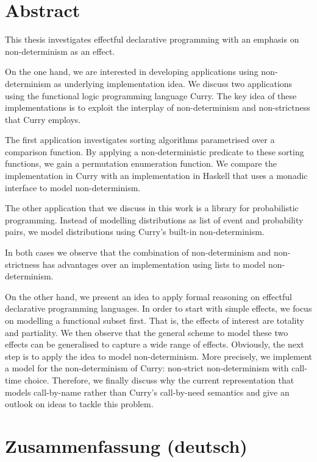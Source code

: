 %
\begingroup
\let\cleardoublepage\clearpage

\chapter*{Abstract}
\label{sec:abstract}
This thesis investigates effectful declarative programming with an emphasis on non-determinism as an effect.

On the one hand, we are interested in developing applications using non-determinism as underlying implementation idea.
We discuss two applications using the functional logic programming language Curry.
The key idea of these implementations is to exploit the interplay of non-determinism and non-strictness that Curry employs.

The first application investigates sorting algorithms parametrised over a comparison function.
By applying a non-deterministic predicate to these sorting functions, we gain a permutation enumeration function.
We compare the implementation in Curry with an implementation in Haskell that uses a monadic interface to model non-determinism.

The other application that we discuss in this work is a library for probabilistic programming.
Instead of modelling distributions as list of event and probability pairs, we model distributions using Curry's built-in non-determinism.

In both cases we observe that the combination of non-determinism and non-strictness has advantages over an implementation using lists to model non-determinism.

On the other hand, we present an idea to apply formal reasoning on effectful declarative programming languages.
In order to start with simple effects, we focus on modelling a functional subset first.
That is, the effects of interest are totality and partiality.
We then observe that the general scheme to model these two effects can be generalised to capture a wide range of effects.
Obviously, the next step is to apply the idea to model non-determinism.
More precisely, we implement a model for the non-determinism of Curry: non-strict non-determinism with call-time choice.
Therefore, we finally discuss why the current representation that models call-by-name rather than Curry's call-by-need semantics and give an outlook on ideas to tackle this problem.

\chapter*{Zusammenfassung (deutsch)}
\label{sec:abstract-diff}

